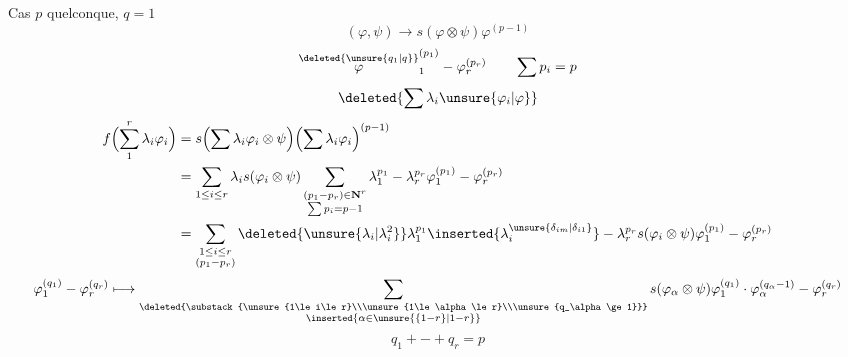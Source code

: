 Cas $p$ quelconque, $q=1$
\[
(\varphi,\psi)\longrightarrow s(\varphi\otimes\psi)\varphi^{(p-1)}
\]
\[
\overset{\deleted{\unsure{q_1|q}}}{\varphi}_1^{(p_1)}-\varphi_r^{(p_r)}\qquad\sum p_i=p
\]
\[
\deleted{\sum\lambda_i\unsure{\varphi_i|\varphi}}
\]
\[
\begin{aligned}
f\Bigl(\sum_1^r\lambda_i\varphi_i\Bigr)
&=s\Bigl(\sum\lambda_i\varphi_i\otimes\psi\Bigr)
\Bigl(\sum\lambda_i\varphi_i\Bigr)^{(p-1)}\\
&=\sum_{1\le i\le r}\lambda_i s(\varphi_i\otimes\psi)
\sum_{\substack{(p_1-p_r)\in\mathbf N^r\\\sum p_i=p-1}}
\lambda_1^{p_1}-\lambda_r^{p_r}\varphi_1^{(p_1)}-\varphi_r^{(p_r)}\\
&=\sum_{\substack{1\le i\le r\\(p_1-p_r)}}
\deleted{\unsure{\lambda_i|\lambda_i^2}}\lambda_1^{p_1}\inserted{\lambda_i^{\unsure{\delta_{im}|\delta_{i1}}}}-\lambda_r^{p_r}
s(\varphi_i\otimes\psi)\varphi_1^{(p_1)}-\varphi_r^{(p_r)}
\end{aligned}
\]
\[
\varphi_1^{(q_1)}-\varphi_r^{(q_r)}\longmapsto
\sum_{\substack{\deleted{\substack{\unsure{1\le i\le r}\\\unsure{1\le\alpha\le r}\\\unsure{q_\alpha\ge1}}}\\\inserted{\alpha\in\unsure{\{1-r\}|1-r}}}}
s(\varphi_\alpha\otimes\psi)\varphi_1^{(q_1)}\cdot
\varphi_\alpha^{(q_\alpha-1)}-\varphi_r^{(q_r)}
\]
\[
q_1+-+q_r=p
\]
